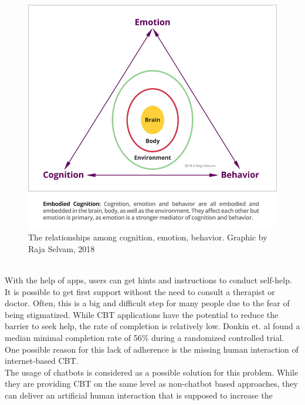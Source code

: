 \documentclass[sigconf, nonacm]{acmart}
\begin{document}
\begin{figure}[h]
  \centering
  \includegraphics[width=\linewidth]{cbt_picture}
  \caption[cbt_circle]{The relationships among cognition, emotion, behavior. Graphic by Raja Selvam, 2018\footnotemark}
  \label{fig:cbt_circle}
\end{figure}
\\
With the help of apps, users can get hints and instructions to conduct self-help. It is possible
to get first support without the need to consult a therapist or doctor. Often, this is a big and 
difficult step for many people due to the fear of being stigmatized\cite{Rossler2016}.
While CBT applications have the potential to reduce the barrier to seek help, the rate of completion
is relatively low. Donkin et. al \cite{Donkin} found a median minimal completion rate of 56\% during a randomized controlled trial. 
One possible reason for this lack of adherence is the missing human interaction of internet-based CBT\cite{Ly2017}.
\\
The usage of chatbots is considered as a possible solution for this problem. While they are providing CBT on the same level 
as non-chatbot based approaches, they can deliver an artificial human interaction that is supposed to increase the
\end{document}
